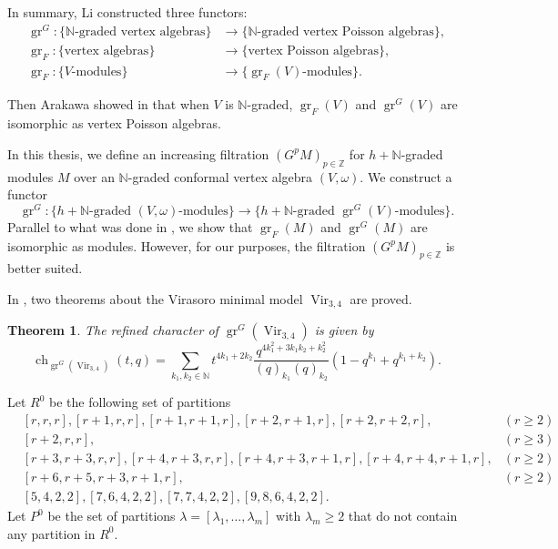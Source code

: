 \documentclass[a4paper, 12pt, reqno]{amsart}
\newtheorem{theorem}{Theorem}[section]
\theoremstyle{remark}
\DeclareMathOperator{\Vir}{Vir}
\DeclareMathOperator{\gr}{gr}
\DeclareMathOperator{\ch}{ch}
\begin{document}
In summary, Li constructed three functors:
\begin{align*}
  \gr^G: \{\text{$\mathbb{N}$-graded vertex algebras}\} &\to \{\text{$\mathbb{N}$-graded vertex Poisson algebras}\}, \\
  \gr_F: \{\text{vertex algebras}\} &\to \{\text{vertex Poisson algebras}\}, \\
  \gr_F: \{\text{$V$-modules}\} &\to \{\text{$\gr_F(V)$-modules}\}.
\end{align*}

Then Arakawa showed in \cite[Proposition 2.6.1]{arakawa_remark_2012} that when $V$ is $\mathbb{N}$-graded, $\gr_F(V)$ and $\gr^G(V)$ are isomorphic as vertex Poisson algebras.

In this thesis, we define an increasing filtration $(G^pM)_{p \in \mathbb{Z}}$ for $h + \mathbb{N}$-graded modules $M$ over an $\mathbb{N}$-graded conformal vertex algebra $(V, \omega)$.
We construct a functor
\begin{equation*}
  \gr^G: \{\text{$h + \mathbb{N}$-graded $(V, \omega)$-modules}\} \to \{\text{$h + \mathbb{N}$-graded $\gr^G(V)$-modules}\}.
\end{equation*}
Parallel to what was done in \cite{arakawa_remark_2012}, we show that $\gr_F(M)$ and $\gr^G(M)$ are isomorphic as modules.
However, for our purposes, the filtration $(G^pM)_{p \in \mathbb{Z}}$ is better suited.

In \cite{andrews_singular_2022}, two theorems about the Virasoro minimal model $\Vir_{3, 4}$ are proved.

\begin{theorem}
  \label{thr:1}
  The refined character of $\gr^G(\Vir_{3, 4})$ is given by
  \begin{equation*}
    \ch_{\gr^G(\Vir_{3, 4})}(t, q) = \sum_{k_1, k_2 \in \mathbb{N}}t^{4k_1 + 2k_2}\frac{q^{4k_1^2 + 3k_1k_2 + k_2^2}}{(q)_{k_1}(q)_{k_2}}(1 - q^{k_1} + q^{k_1 + k_2}).
  \end{equation*}
\end{theorem}

Let $R^0$ be the following set of partitions
\begin{align*}
  &[r, r, r], [r + 1, r, r], [r + 1, r + 1, r], [r + 2, r + 1, r], [r + 2, r + 2, r], &(r \ge 2) \\
  &[r + 2, r, r], &(r \ge 3) \\
  &[r + 3, r + 3, r, r], [r + 4, r + 3, r, r],  [r + 4, r + 3, r + 1, r], [r + 4, r + 4, r + 1, r], &(r \ge 2) \\
  &[r + 6, r + 5, r + 3, r + 1, r], &(r \ge 2) \\
  &[5, 4, 2, 2], [7, 6, 4, 2, 2], [7, 7, 4, 2, 2], [9, 8, 6, 4, 2, 2].
\end{align*}
Let $P^0$ be the set of partitions $\lambda = [\lambda_1, \dots, \lambda_m]$ with $\lambda_m \ge 2$ that do not contain any partition in $R^0$.
\end{document}
